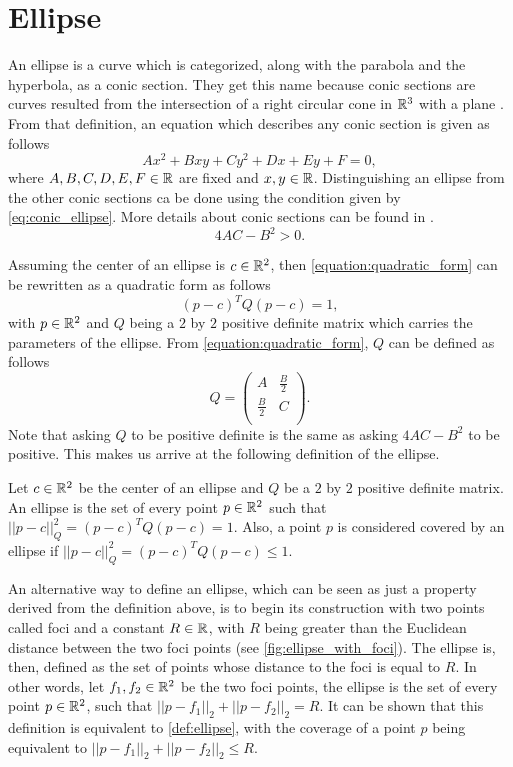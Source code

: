 \section{Ellipse}

An ellipse is a curve which is categorized, along with the parabola and the hyperbola, as a conic section. 
They get this name because conic sections are curves resulted from the intersection of a right circular cone in $\mathbb{R}^3$ with a plane \cite{brannan:geometry}. From that definition, an equation which describes any conic section is given as follows
\begin{equation}\label{equation:quadratic_form}
Ax^2 + Bxy + Cy^2 + Dx + Ey + F = 0,
\end{equation}
where $A,B,C,D,E,F \in \mathbb{R}$ are fixed and $x, y \in \mathbb{R}$. Distinguishing an ellipse from the other conic sections ca be done using the condition given by \autoref{eq:conic_ellipse}. More details about conic sections can be found in .
\begin{equation}\label{eq:conic_ellipse}
4AC - B^2>0.
\end{equation}

Assuming the center of an ellipse is $c \in \mathbb{R}^2$, then \autoref{equation:quadratic_form} can be rewritten as a quadratic form as follows
\begin{equation}
(p-c)^{T}Q(p-c) = 1,
\end{equation}
with $p \in \mathbb{R}^2$ and $Q$ being a $2$ by $2$ positive definite matrix which carries the parameters of the ellipse. From \autoref{equation:quadratic_form}, $Q$ can be defined as follows
\[
Q=
\left( {\begin{array}{cc}
	A & \frac{B}{2} \\
	\frac{B}{2} & C \\
	\end{array} } \right).
\]
Note that asking $Q$ to be positive definite is the same as asking $4AC-B^2$ to be positive. This makes us arrive at the following definition of the ellipse.

\begin{definicao}\label{def:ellipse}
    Let $c\in \mathbb{R}^2$ be the center of an ellipse and $Q$ be a $2$ by $2$ positive definite matrix. An ellipse is the set of every point $p \in \mathbb{R}^2$ such that $||p-c||_{Q}^2 = (p-c)^{T}Q(p-c) = 1$. Also, a point $p$ is considered covered by an ellipse if $||p-c||_{Q}^2 = (p-c)^{T}Q(p-c) \le 1$.
\end{definicao}

An alternative way to define an ellipse, which can be seen as just a property derived from the definition above, is to begin its construction with two points called foci and a constant $R \in \mathbb{R}$, with $R$ being greater than the Euclidean distance between the two foci points (see \autoref{fig:ellipse_with_foci}). The ellipse is, then, defined as the set of points whose distance to the foci is equal to $R$. In other words, let $f_1, f_2 \in \mathbb{R}^2$ be the two foci points, the ellipse is the set of every point $p \in \mathbb{R}^2$, such that $||p-f_1||_2 + ||p-f_2||_2 = R$. It can be shown that this definition is equivalent to \autoref{def:ellipse}, with the coverage of a point $p$ being equivalent to $||p-f_1||_2 + ||p-f_2||_2 \le R$.

